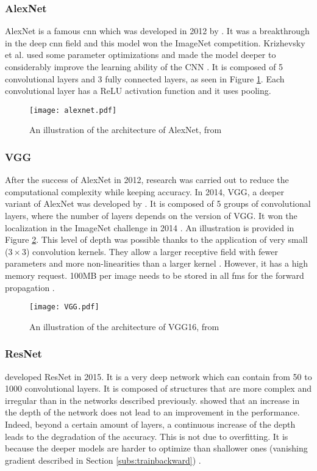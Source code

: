 \subsubsection{AlexNet}
%
AlexNet is a famous \acrshort{cnn} which was developed in 2012 by \textcite{krizhevsky_imagenet_2012}. It was a breakthrough in the deep \acrshort{cnn} field and this model won the ImageNet competition. Krizhevsky et al. used some parameter optimizations and made the model deeper to considerably improve the learning ability of the CNN \cite{khan_survey_2020}. It is composed of 5 convolutional layers and 3 fully connected layers, as seen in Figure \ref{fig:alexnet}. Each convolutional layer has a ReLU activation function and it uses pooling.
%
\begin{figure}[H]
    \centering
    \texttt{[image: alexnet.pdf]}
    \caption{An illustration of the architecture of AlexNet, from \cite{krizhevsky_imagenet_2012}}
    \label{fig:alexnet}
\end{figure}
%
\subsubsection{VGG}
%
After the success of AlexNet in 2012, research was carried out to reduce the computational complexity while keeping accuracy. In 2014, VGG, a deeper variant of AlexNet was developed by \textcite{simonyan_very_2015}. It is composed of 5 groups of convolutional layers, where the number of layers depends on the version of VGG. It won the localization in the ImageNet challenge in 2014 \cite{simonyan_very_2015}. An illustration is provided in Figure \ref{fig:vgg}. This level of depth was possible thanks to the application of very small ($3 \times 3$) convolution kernels. They allow a larger receptive field with fewer parameters and more non-linearities than a larger kernel \cite{matteucci_artificial_2019}. However, it has a high memory request. 100MB per image needs to be stored in all \acrshort{fm}s for the forward propagation \cite{matteucci_artificial_2019}.
%
\begin{figure}[H]
    \centering
    \texttt{[image: VGG.pdf]}
    \caption{An illustration of the architecture of VGG16, from \cite{simonyan_very_2015}}
    \label{fig:vgg}
\end{figure}
%
\subsubsection{ResNet}
%
\textcite{he_deep_2016} developed ResNet in 2015. It is a very deep network which can contain from 50 to 1000 convolutional layers. It is composed of structures that are more complex and irregular than in the networks described previously. \textcite{he_deep_2016} showed that an increase in the depth of the network does not lead to an improvement in the performance. Indeed, beyond a certain amount of layers, a continuous increase of the depth leads to the degradation of the accuracy. This is not due to overfitting. It is because the deeper models are harder to optimize than shallower ones (vanishing gradient described in Section \ref{subs:trainbackward}) \cite{matteucci_artificial_2019}. 


